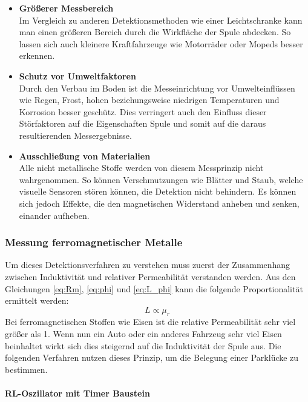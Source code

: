 \begin{itemize}
    \item \textbf{Größerer Messbereich} \\
    Im Vergleich zu anderen Detektionsmethoden wie einer Leichtschranke kann man einen größeren Bereich durch die Wirkfläche
    der Spule abdecken. So lassen sich auch kleinere Kraftfahrzeuge wie Motorräder oder Mopeds besser erkennen.
    \item \textbf{Schutz vor Umweltfaktoren} \\
    Durch den Verbau im Boden ist die Messeinrichtung vor Umwelteinflüssen wie Regen, Frost, hohen beziehungsweise
    niedrigen Temperaturen und Korrosion besser geschütz. Dies verringert auch den Einfluss dieser Störfaktoren auf die Eigenschaften
    Spule und somit auf die daraus resultierenden Messergebnisse.
    \item \textbf{Ausschließung von Materialien} \\
    Alle nicht metallische Stoffe werden von diesem Messprinzip nicht wahrgenommen. So können Verschmutzungen wie Blätter und Staub, welche
    visuelle Sensoren stören können, die Detektion nicht behindern. Es können sich jedoch Effekte, die den magnetischen Widerstand anheben und senken, 
    einander aufheben. 
    
\end{itemize}
\subsubsection{Messung ferromagnetischer Metalle}
Um dieses Detektionsverfahren zu verstehen muss zuerst der Zusammenhang zwischen Induktivität und relativer Permeabilität verstanden werden.
Aus den Gleichungen \ref{eq:Rm}, \ref{eq:phi} und \ref{eq:L_phi} kann die folgende Proportionalität ermittelt werden:
\begin{equation} \label{iq:L_mu}
    L \propto \mu_{r}
\end{equation}
Bei ferromagnetischen Stoffen wie Eisen ist die relative Permeabilität sehr viel größer als 1. Wenn nun ein Auto oder 
ein anderes Fahrzeug sehr viel Eisen beinhaltet wirkt sich dies steigernd auf die Induktivität der Spule aus. Die folgenden
Verfahren nutzen dieses Prinzip, um die Belegung einer Parklücke zu bestimmen.

\paragraph{RL-Oszillator mit Timer Baustein}\mbox{}

